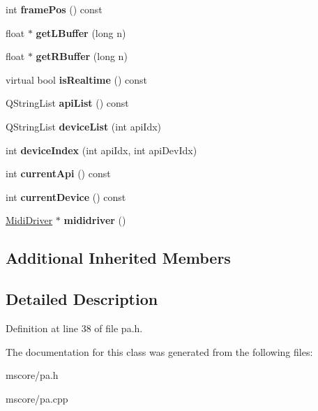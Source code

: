 \begin{DoxyCompactItemize}
\item 
\mbox{\label{class_ms_1_1_portaudio_aabe251f446996f61f04a871b63b18d4d}} 
int {\bfseries frame\+Pos} () const
\item 
\mbox{\label{class_ms_1_1_portaudio_aa963824983cbd8bc21b5ec3b82e1116e}} 
float $\ast$ {\bfseries get\+L\+Buffer} (long n)
\item 
\mbox{\label{class_ms_1_1_portaudio_a3f6e50e7f67d890a0aeccbfdf2857407}} 
float $\ast$ {\bfseries get\+R\+Buffer} (long n)
\item 
\mbox{\label{class_ms_1_1_portaudio_a5bd66500fc817e01cf1217779a7f69cd}} 
virtual bool {\bfseries is\+Realtime} () const
\item 
\mbox{\label{class_ms_1_1_portaudio_a8d6d1ed7489f17023146090c2c58d16d}} 
Q\+String\+List {\bfseries api\+List} () const
\item 
\mbox{\label{class_ms_1_1_portaudio_ae12b0249fb0e20a87bb8d901f78abf12}} 
Q\+String\+List {\bfseries device\+List} (int api\+Idx)
\item 
\mbox{\label{class_ms_1_1_portaudio_aeefecaf47e7633cca40bc0b6284d7f3d}} 
int {\bfseries device\+Index} (int api\+Idx, int api\+Dev\+Idx)
\item 
\mbox{\label{class_ms_1_1_portaudio_a30fa955daf819165cc2c0f914f4b0c07}} 
int {\bfseries current\+Api} () const
\item 
\mbox{\label{class_ms_1_1_portaudio_afd1e2c6aef574e69f0646e1b4290071f}} 
int {\bfseries current\+Device} () const
\item 
\mbox{\label{class_ms_1_1_portaudio_a36d78522784c1025cf39be9f14077409}} 
\hyperlink{class_ms_1_1_midi_driver}{Midi\+Driver} $\ast$ {\bfseries mididriver} ()
\end{DoxyCompactItemize}
\subsection*{Additional Inherited Members}


\subsection{Detailed Description}


Definition at line 38 of file pa.\+h.



The documentation for this class was generated from the following files\+:\begin{DoxyCompactItemize}
\item 
mscore/pa.\+h\item 
mscore/pa.\+cpp\end{DoxyCompactItemize}
